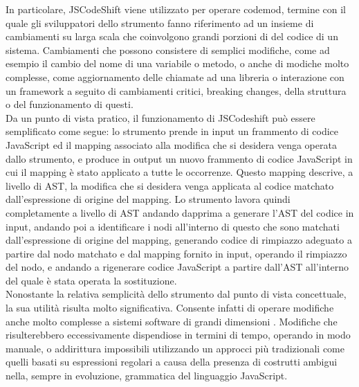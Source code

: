 In particolare, JSCodeShift viene utilizzato per operare codemod, termine con
il quale gli sviluppatori dello strumento fanno riferimento ad un insieme di
cambiamenti su larga scala che coinvolgono grandi porzioni di del codice di un
sistema. Cambiamenti che possono consistere di semplici modifiche, come ad
esempio il cambio del nome di una variabile o metodo, o anche di modiche molto
complesse, come aggiornamento delle chiamate ad una libreria o interazione con
un framework a seguito di cambiamenti critici, breaking changes, della
struttura o del funzionamento di questi.\\

Da un punto di vista pratico, il funzionamento di JSCodeshift può essere
semplificato come segue: lo strumento prende in input un frammento di codice
JavaScript ed il mapping associato alla modifica che si desidera venga operata
dallo strumento, e produce in output un nuovo frammento di codice JavaScript in
cui il mapping è stato applicato a tutte le occorrenze. Questo mapping
descrive, a livello di AST, la modifica che si desidera venga applicata al
codice matchato dall’espressione di origine del mapping. Lo strumento lavora
quindi completamente a livello di AST andando dapprima a generare l’AST del
codice in input, andando poi a identificare i nodi all’interno di questo che
sono matchati dall’espressione di origine del mapping, generando codice di
rimpiazzo adeguato a partire dal nodo matchato e dal mapping fornito in input,
operando il rimpiazzo del nodo, e andando a rigenerare codice JavaScript a
partire dall’AST all’interno del quale è stata operata la sostituzione.\\

Nonostante la relativa semplicità dello strumento dal punto di vista
concettuale, la sua utilità risulta molto significativa. Consente infatti di
operare modifiche anche molto complesse a sistemi software di grandi dimensioni
\cite{jsconf2016}. Modifiche che risulterebbero eccessivamente dispendiose in
termini di tempo, operando in modo manuale, o addirittura impossibili
utilizzando un approcci più tradizionali come quelli basati su espressioni
regolari a causa della presenza di costrutti ambigui nella, sempre in
evoluzione, grammatica del linguaggio JavaScript.\\


